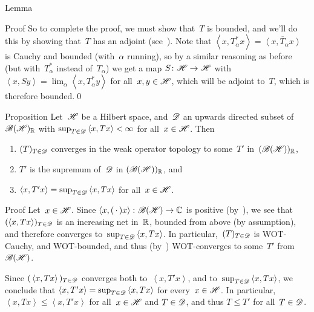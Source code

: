 \documentclass[a]{subfiles}
\begin{document}
\begin{parsec}
\begin{point}{Lemma}
\begin{point}{Proof}
So to complete the proof,
we must show that~$T$ is bounded,
and we'll do this by showing that~$T$ has an adjoint
(see~).
Note that $\left<x,T_\alpha^* x\right>=\overline{\left<x,T_\alpha x\right>}$
is Cauchy and bounded (with~$\alpha$ running),
so by a similar reasoning as before (but with~$T^*_\alpha$
instead of~$T_\alpha$)
we get a map
$S\colon \mathscr{H}\to\mathscr{H}$
with $\left<x,Sy\right>=\lim_\alpha \left<x,T^*_\alpha y\right>$
for all~$x,y\in\mathscr{H}$, which will be adjoint to~$T$,
which is therefore bounded.\qed
\end{point}
\end{point}
\begin{point}{Proposition}%
Let~$\mathscr{H}$ be a Hilbert space,
and~$\mathscr{D}$ an upwards directed subset of~$\mathscr{B}(\mathscr{H})_{\mathbb{R}}$
with $\sup_{T\in \mathscr{D}} \left<x,Tx\right> <\infty$
for all~$x\in \mathscr{H}$. Then
\begin{enumerate}
\item
$(T)_{T\in\mathscr{D}}$
converges 
in the weak operator topology
to some~$T'$ in~$(\mathscr{B}(\mathscr{H}))_{\mathbb{R}}$,
\item
$T'$ is the supremum of~$\mathscr{D}$
in $(\mathscr{B}(\mathscr{H}))_{\mathbb{R}}$,
and 
\item
$\left<x,T'x\right> = 
\sup_{T\in\mathscr{D}}\left<x,Tx\right> $
for all~$x\in \mathscr{H}$.
\end{enumerate}
\begin{point}{Proof}%
Let~$x\in \mathscr{H}$.
Since $\left<x,(\,\cdot\,)x\right>\colon \mathscr{B}(\mathscr{H})\to \mathbb{C}$
is positive (by~\TODO{}),
we see that
$(\left<x,Tx\right>)_{T\in\mathscr{D}}$
is an increasing net in~$\mathbb{R}$, 
bounded from above (by assumption),
and therefore converges to~$\sup_{T\in\mathscr{D}}\left<x,Tx\right>$.
In particular,~$(T)_{T\in\mathscr{D}}$
is WOT-Cauchy,
and WOT-bounded,
and thus
(by~)
WOT-converges to some~$T'$ from~$\mathscr{B}(\mathscr{H})$.

Since $(\,\left<x,Tx\right>\,)_{T\in\mathscr{D}}$
converges both to~$\left<x,T'x\right>$,
and to~$\sup_{T\in\mathscr{D}} \left<x,Tx\right>$,
we conclude that $\left<x,T'x\right>=\sup_{T\in\mathscr{D}}\left<x,Tx\right>$
for every~$x\in\mathscr{H}$.
In particular,  $\left<x,Tx\right>\leq \left<x,T'x\right>$
for all~$x\in\mathscr{H}$ and $T\in\mathscr{D}$, and thus $T\leq T'$
for all~$T\in\mathscr{D}$.


\end{point}
\end{point}
\end{parsec}
\end{document}
